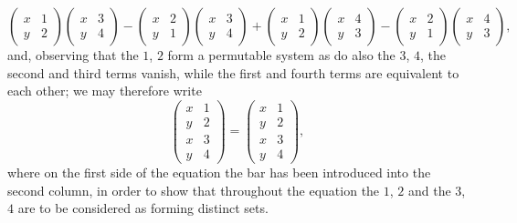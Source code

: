 \documentclass[11pt,a4paper]{article}
\theoremstyle{plain}
\begin{document}
\[\begin{pmatrix} x & 1 \\ y & 2 \end{pmatrix} \begin{pmatrix} x & 3 \\ y & 4 \end{pmatrix} - \begin{pmatrix} x & 2 \\ y & 1 \end{pmatrix} \begin{pmatrix} x & 3 \\ y & 4 \end{pmatrix} + \begin{pmatrix} x & 1 \\ y & 2 \end{pmatrix} \begin{pmatrix} x & 4 \\ y & 3 \end{pmatrix} - \begin{pmatrix} x & 2 \\ y & 1 \end{pmatrix} \begin{pmatrix} x & 4 \\ y & 3 \end{pmatrix},\]
and, observing that the $1$, $2$ form a permutable system as do also the $3$, $4$, the second and third terms vanish, while the first and fourth terms are equivalent to each other; we may therefore write
\[\begin{pmatrix} x & 1 \\ y & 2 \\ \hline x & 3 \\ y & 4 \end{pmatrix} = \begin{pmatrix} x & 1 \\ y & 2 \\ \hline x & 3 \\ y & 4 \end{pmatrix},\]
where on the first side of the equation the bar has been introduced into the second column, in order to show that throughout the equation the $1$, $2$ and the $3$, $4$ are to be considered as forming distinct sets.
\end{document}
